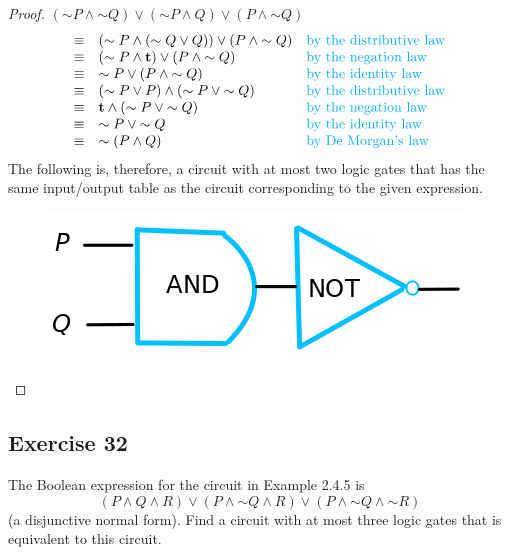 \documentclass[14pt]{extarticle}
\begin{document}
\begin{proof} $({\sim P} \wedge {\sim Q}) \vee ({\sim P} \wedge Q) \vee (P
\wedge {\sim Q})$ $$ \begin{array}{cll} \equiv & ({\sim P} \wedge ({\sim Q} \vee
Q)) \vee (P \wedge {\sim Q}) & \text{\color{cyan}by the distributive law} \\
\equiv & ({\sim P} \wedge {\bf t}) \vee (P \wedge {\sim Q}) & \text{\color{cyan}by
the negation law} \\ \equiv & {\sim P} \vee (P \wedge {\sim Q}) &
\text{\color{cyan}by the identity law} \\ \equiv & ({\sim P} \vee P) \wedge
({\sim P} \vee {\sim Q}) & \text{\color{cyan}by the distributive law} \\ \equiv
& {\bf t} \wedge ({\sim P} \vee {\sim Q}) & \text{\color{cyan}by the negation law}
\\ \equiv & {\sim P} \vee {\sim Q} & \text{\color{cyan}by the identity law} \\
\equiv & {\sim (P \wedge Q)} & \text{\color{cyan}by De Morgan's law} \\
\end{array} $$ The following is, therefore, a circuit with at most two logic
gates that has the same input/output table as the circuit corresponding to the
given expression. \begin{figure}[ht!] \centering
\includegraphics[scale=0.4]{../images/2.4.31.png} \end{figure} \end{proof}

\subsection{Exercise 32} The Boolean expression for the circuit in Example 2.4.5
is $$ (P \wedge Q \wedge R) \vee (P \wedge {\sim Q} \wedge R) \vee (P \wedge
{\sim Q}\wedge {\sim R}) $$ (a disjunctive normal form). Find a circuit with at
most three logic gates that is equivalent to this circuit.
\end{document}

